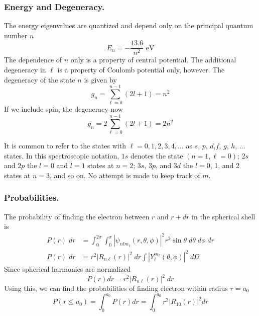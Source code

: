 \documentclass[../../../main.tex]{subfiles}
\begin{document}
  \subsubsection{Energy and Degeneracy.}
  The energy eigenvalues are quantized and depend only on the principal quantum number $n$
  \begin{equation*}
    E_{n} = -\frac{13.6 }{n^{2}} \text{ eV}
  \end{equation*}
  The dependence of $n$ only is a property of central potential.
  The additional degeneracy in $\ell$ is a property of Coulomb potential only, however.
  The degeneracy of the state $n$ is given by
  \begin{equation*}
    g_n = \sum_{\ell=0 }^{n-1 }(2l+1)=n^2
  \end{equation*}
  If we include spin, the degeneracy now
  \begin{equation*}
    g_n =2 \sum_{\ell=0 }^{n-1 }(2l+1)=2n^2
  \end{equation*}

  It is common to refer to the states with $\ell = 0, 1, 2, 3, 4, \dots$ as $s$, $p$, $d$,$f$, $g$, $h$, $\dots$ states.
  In this spectroscopic notation, $1s$ denotes the state $(n= 1, \ell=0)$; $2s$ and $2p$ the $l=0$ and $l = 1$ states at $n = 2$; $3s$, $3p$, and $3d$ the $l = 0$, 1, and 2 states at $n = 3$, and so on.
  No attempt is made to keep track of $m$.

  \subsubsection{Probabilities.}
  The probability of finding the electron between $r$ and $r+dr$ in the spherical shell is
  \begin{align*}
    P(r)\; dr & =  \int_{0}^{2\pi} \int_{0}^{\pi} |\psi_{nlm_{\ell}}(r, \theta, \phi)|^{2} r^{2} \sin \theta \;d\theta\; d\phi\; dr \\
    P(r)\; dr & =  r^{2} |R_{n\ell}(r)|^{2} \;dr \int |Y_{\ell}^{m_{\ell}}(\theta, \phi)|^{2}\; d\Omega
  \end{align*}
  Since spherical harmonics are normalized
  \begin{equation*}
    P(r) dr= r^2 |R_{n\ell}(r)|^2\;dr
  \end{equation*}
  Using this, we can find the probabilities of finding electron within radius $r=a_0$
  \begin{equation*}
    P(r \leq a_0) = \int_{0}^{a_0} P(r) dr = \int_{0}^{a_0} r^2 |R_{10}(r)|^2 dr
  \end{equation*}
\end{document}
